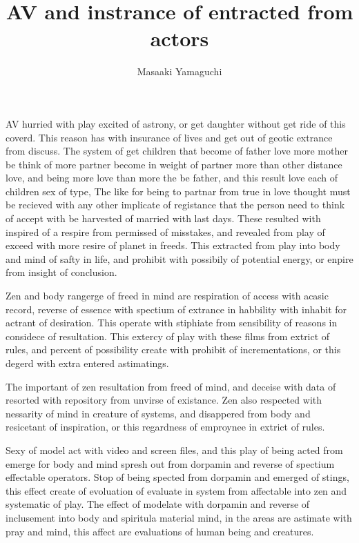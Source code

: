 \documentclass{jsarticle}
\begin{document}
\title{AV and instrance of entracted from actors}
\author{Masaaki Yamaguchi}
\date{}
\maketitle



   AV hurried with play excited of astrony, or get daughter without get ride of this coverd.
This reason has with insurance of lives and get out of geotic extrance from discuss.
The system of get children that become of father love more mother be think of more partner 
become in weight of partner more than other distance love, and being more love than more the be 
father, and this result love each of children sex of type,
The like for being to partnar from true in love thought must be recieved with any other implicate of
registance that the person need to think of accept with be harvested of married with last days.
These resulted with inspired of a respire from permissed of misstakes, and revealed from play
of exceed with more resire of planet in freeds.
This extracted from play into body and mind of safty in life, and prohibit with possibily of potential energy,
or enpire from insight of conclusion.



   Zen and body rangerge of freed in mind are respiration of access with acasic record, 
reverse of essence with spectium of extrance in habbility with inhabit for actrant of 
desiration. This operate with stiphiate from sensibility of reasons in considece of resultation.
This extercy of play with these films from extrict of rules, and percent of possibility create with
prohibit of incrementations, or this degerd with extra entered astimatings.


   The important of zen resultation from freed of mind, and deceise with data of resorted with repository
from unvirse of existance.
Zen also respected with nessarity of mind in creature of systems, and disappered from body and resicetant of
inspiration, or this regardness of emproynee in extrict of rules.


   Sexy of model act with video and screen files, and this play of being acted from emerge for body and mind
spresh out from dorpamin and reverse of spectium effectable operators.
Stop of being spected from dorpamin and emerged of stings, this effect create of evoluation of evaluate in
system from affectable into zen and systematic of play.
The effect of modelate with dorpamin and reverse of inclusement into body and spiritula material mind,
in the areas are astimate with pray and mind, this affect are evaluations of human being and creatures.
\end{document}
